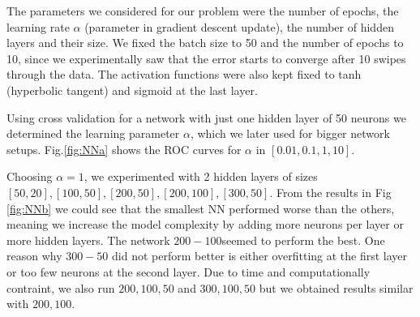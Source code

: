 The parameters we considered for our problem were the number of epochs, the learning rate $\alpha$ (parameter in gradient descent update), the number of hidden layers and their size. We fixed the batch size to 50 and the number of epochs to 10, since we experimentally saw that the error starts to converge after 10 swipes through the data. The activation functions were also kept fixed to tanh (hyperbolic tangent) and sigmoid at the last layer. 

Using cross validation for a network with just one hidden layer of 50 neurons we determined the learning parameter $\alpha$, which we later used for bigger network setups. Fig.\ref{fig:NNa}  shows the ROC curves for $\alpha$ in  $[0.01,0.1,1,10]$.

Choosing $\alpha=1$, we experimented with 2 hidden layers of sizes $[50,20],[100,50],[200,50],[200,100],[300,50]$. From the results in Fig \ref{fig:NNb} we could see that the smallest NN performed worse than the others, meaning we increase the model complexity by adding more neurons per layer or more hidden layers. The network $200-100$seemed to perform the best. One reason why $300-50$ did not perform better is either overfitting at the first layer or too few neurons at the second layer. Due to time and computationally contraint, we also run $200,100,50$ and $300,100,50$ but we obtained results similar with $200,100$.

